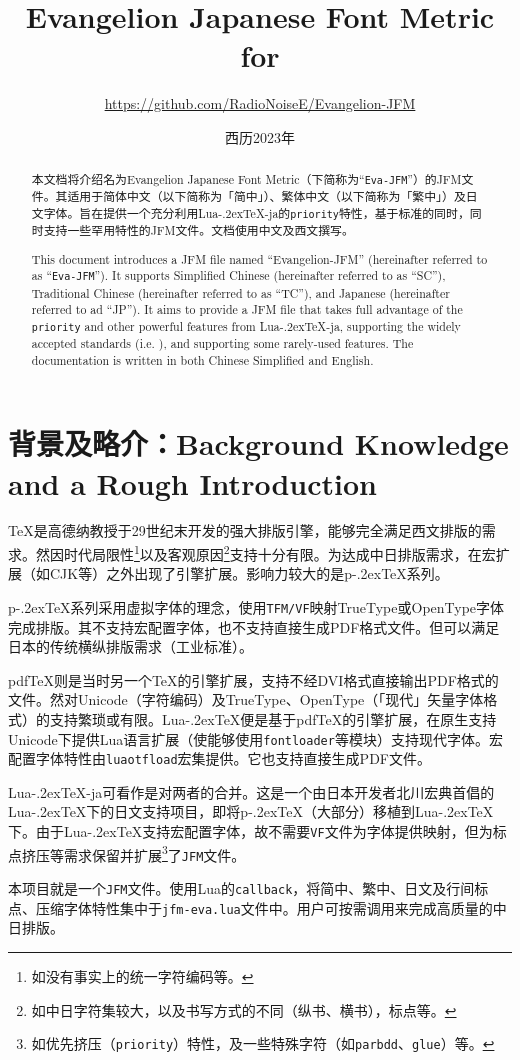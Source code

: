 \documentclass{ltjsarticle}
\title{\sffamily\bfseries Evangelion Japanese Font Metric for \LuaTeX}
\author{\large \url{https://github.com/RadioNoiseE/Evangelion-JFM}}
\date{西历2023年}
\def\段{\par}
\def\LuaTeX{Lua\kern-.2ex\TeX}
\def\pTeX{p\kern-.2ex\TeX}
\def\pdfTeX{pdf\TeX}
\begin{document}
\zw\parskip2pt

\maketitle

\begin{abstract}
    本文档将介绍名为Evangelion Japanese Font Metric（下简称为``\texttt{Eva-JFM}''）的JFM文件。其适用于简体中文（以下简称为「简中」）、繁体中文（以下简称为「繁中」）及日文字体。旨在提供一个充分利用\LuaTeX{}-ja的\texttt{priority}特性，基于标准\cite{jlreq}的同时，同时支持一些罕用特性的JFM文件。文档使用中文及西文撰写。\段
    This document introduces a JFM file named ``Evangelion-JFM'' (hereinafter referred to as ``\texttt{Eva-JFM}''). It supports Simplified Chinese (hereinafter referred to as ``SC''), Traditional Chinese (hereinafter referred to as ``TC''), and Japanese (hereinafter referred to ad ``JP''). It aims to provide a JFM file that takes full advantage of the \texttt{priority} and other powerful features from \LuaTeX{}-ja, supporting the widely accepted standards (i.e. \cite{jlreq}), and supporting some rarely-used features. The documentation is written in both Chinese Simplified and English.
\end{abstract}

\section{背景及略介：Background Knowledge and a Rough Introduction}
\TeX{}是高德纳教授于29世纪末开发的强大排版引擎，能够完全满足西文排版的需求。然因时代局限性\footnote{如没有事实上的统一字符编码等。}以及客观原因\footnote{如中日字符集较大，以及书写方式的不同（纵书、横书），标点等。}支持十分有限。为达成中日排版需求，在宏扩展（如CJK等）之外出现了引擎扩展。影响力较大的是\pTeX{}系列。\段
\pTeX{}系列采用虚拟字体的理念，使用\texttt{TFM/VF}映射TrueType或OpenType字体完成排版。其不支持宏配置字体，也不支持直接生成PDF格式文件。但可以满足日本的传统横纵排版需求（工业标准）。\段
\pdfTeX{}则是当时另一个\TeX{}的引擎扩展，支持不经DVI格式直接输出PDF格式的文件。然对Unicode（字符编码）及TrueType、OpenType（「现代」矢量字体格式）的支持繁琐或有限。\LuaTeX{}便是基于\pdfTeX{}的引擎扩展，在原生支持Unicode下提供Lua语言扩展（使能够使用\texttt{fontloader}等模块）支持现代字体。宏配置字体特性由\texttt{luaotfload}宏集提供。它也支持直接生成PDF文件。\段
\LuaTeX{}-ja可看作是对两者的合并。这是一个由日本开发者北川宏典首倡的\LuaTeX{}下的日文支持项目，即将\pTeX{}（大部分）移植到\LuaTeX{}下。由于\LuaTeX{}支持宏配置字体，故不需要\texttt{VF}文件为字体提供映射，但为标点挤压等需求保留并扩展\footnote{如优先挤压（\texttt{priority}）特性，及一些特殊字符（如\texttt{parbdd}、\texttt{glue}）等。}了\texttt{JFM}文件。\段
本项目就是一个\texttt{JFM}文件。使用Lua的\texttt{callback}，将简中、繁中、日文及行间标点、压缩字体特性集中于\texttt{jfm-eva.lua}文件中。用户可按需调用来完成高质量的中日排版。
\end{document}
